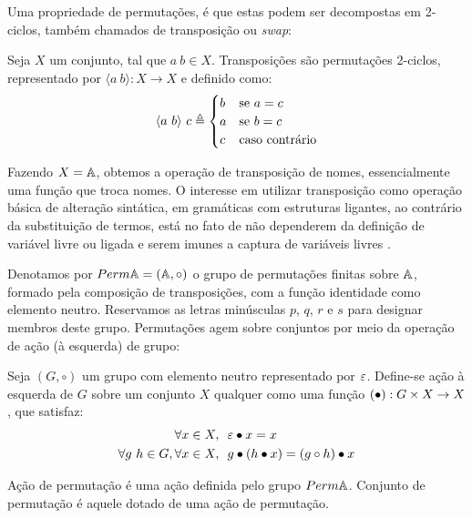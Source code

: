 Uma propriedade de permutações, é que estas podem ser decompostas em 2-ciclos, também chamados de transposição ou \textit{swap}:
\begin{definicao}\label{def:swap}
	Seja $X$ um conjunto, tal que $a~b \in X$. Transposições são permutações 2-ciclos, representado por $\langle a~b \rangle : X \rightarrow X$ e definido como:
	\begin{equation}
		\langle a~b \rangle ~c \triangleq 
		\begin{cases}
			b & \text{\normalfont se } a = c \\
			a & \text{\normalfont se } b = c \\
			c & \text{\normalfont caso contrário}
		\end{cases}
	\end{equation} 
\end{definicao}\noindent
Fazendo $X = \mathbb{A}$, obtemos a operação de transposição de nomes, essencialmente uma função que troca nomes. O interesse em utilizar transposição como operação básica de alteração sintática, em gramáticas com estruturas ligantes, ao contrário da substituição de termos, está no fato de não dependerem da definição de variável livre ou ligada e serem imunes a captura de variáveis livres \cite{Pitts2003}. 

Denotamos por $Perm \mathbb{A} = (\mathbb{A}, \circ)$ o grupo de permutações finitas sobre $\mathbb{A}$, formado pela composição de transposições, com a função identidade como elemento neutro. Reservamos as letras minúsculas $p$, $q$, $r$ e $s$ para designar membros deste grupo. Permutações agem sobre conjuntos por meio da operação de ação (à esquerda) de grupo:
\begin{definicao}
	Seja $(G, \circ)$ um grupo com elemento neutro representado por $\varepsilon$.  Define-se ação à esquerda de $G$ sobre um conjunto $X$ qualquer como uma função $(\bullet) : G \times X \rightarrow X$,
	que satisfaz:
	\begin{align}
		\forall x \in X,&~~ \varepsilon \bullet x = x \label{eq:act-neutral}\\
		\forall g~h \in G, \forall x \in X,&~~ g \bullet (h \bullet x) = (g \circ h) \bullet x \label{eq:act-compat}
	\end{align}
\end{definicao}\noindent
\begin{definicao}\label{def:acao-permutacao}
	Ação de permutação é uma ação definida pelo grupo $Perm \mathbb{A}$. Conjunto de permutação é aquele dotado de uma ação de permutação.
\end{definicao}\noindent

